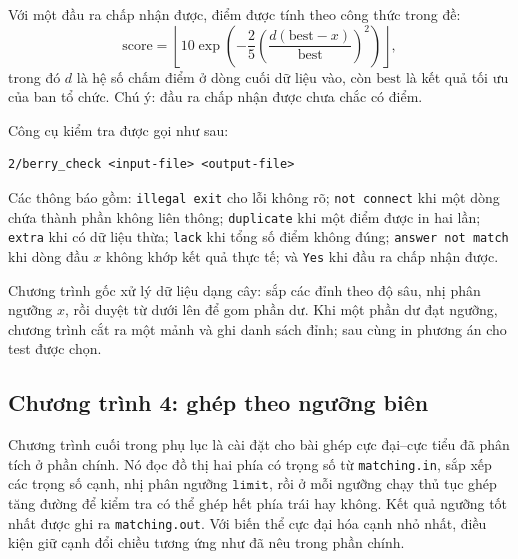 \documentclass[11pt]{article}
\begin{document}
Với một đầu ra chấp nhận được, điểm được tính theo công thức trong đề:
\[
  \mathrm{score}=
  \left\lfloor
  10\exp\left(-\frac{2}{5}\left(\frac{d(\mathrm{best}-x)}
  {\mathrm{best}}\right)^2\right)
  \right\rfloor,
\]
trong đó \(d\) là hệ số chấm điểm ở dòng cuối dữ liệu vào, còn
\(\mathrm{best}\) là kết quả tối ưu của ban tổ chức. Chú ý: đầu ra chấp nhận
được chưa chắc có điểm.

Công cụ kiểm tra được gọi như sau:
\begin{verbatim}
2/berry_check <input-file> <output-file>
\end{verbatim}
Các thông báo gồm: \texttt{illegal exit} cho lỗi không rõ; \texttt{not connect}
khi một dòng chứa thành phần không liên thông; \texttt{duplicate} khi một điểm
được in hai lần; \texttt{extra} khi có dữ liệu thừa; \texttt{lack} khi tổng số
điểm không đúng; \texttt{answer not match} khi dòng đầu \(x\) không khớp kết
quả thực tế; và \texttt{Yes} khi đầu ra chấp nhận được.

Chương trình gốc xử lý dữ liệu dạng cây: sắp các đỉnh theo độ sâu, nhị phân
ngưỡng \(x\), rồi duyệt từ dưới lên để gom phần dư. Khi một phần dư đạt
ngưỡng, chương trình cắt ra một mảnh và ghi danh sách đỉnh; sau cùng in
phương án cho test được chọn.

\subsection{Chương trình 4: ghép theo ngưỡng biên}

Chương trình cuối trong phụ lục là cài đặt cho bài ghép cực đại--cực tiểu đã
phân tích ở phần chính. Nó đọc đồ thị hai phía có trọng số từ
\texttt{matching.in}, sắp xếp các trọng số cạnh, nhị phân ngưỡng \(\texttt{limit}\),
rồi ở mỗi ngưỡng chạy thủ tục ghép tăng đường để kiểm tra có thể ghép hết phía
trái hay không. Kết quả ngưỡng tốt nhất được ghi ra \texttt{matching.out}. Với
biến thể cực đại hóa cạnh nhỏ nhất, điều kiện giữ cạnh đổi chiều tương ứng như
đã nêu trong phần chính.
\end{document}
